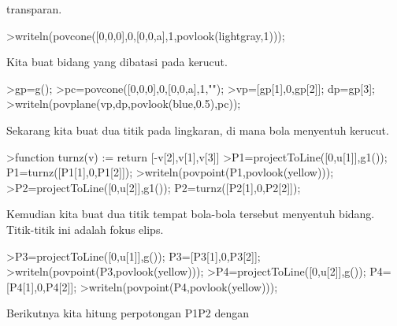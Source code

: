 \documentclass[a4paper,10pt]{article}
\begin{document}
\begin{eulernotebook}
\begin{eulercomment}
\begin{eulercomment}
\begin{eulercomment}
\begin{eulercomment}
\begin{eulercomment}
\begin{eulercomment}
\begin{eulercomment}
\begin{eulercomment}
\begin{eulercomment}
\begin{eulercomment}
\begin{eulercomment}
\begin{eulercomment}
\begin{eulercomment}
\begin{eulercomment}
\begin{eulercomment}
\begin{eulercomment}
\begin{eulercomment}
\begin{eulercomment}
\begin{eulercomment}
\begin{eulercomment}
\begin{eulercomment}
\begin{eulercomment}
\begin{eulercomment}
\begin{eulercomment}
\begin{eulercomment}
\begin{eulercomment}
\begin{eulercomment}
\begin{eulercomment}
\begin{eulercomment}
\begin{eulercomment}
\begin{eulercomment}
\begin{eulercomment}
\begin{eulercomment}
\begin{eulercomment}
\begin{eulercomment}
\begin{eulercomment}
\begin{eulercomment}
\begin{eulercomment}
\begin{eulercomment}
\begin{eulercomment}
\begin{eulercomment}
\begin{eulercomment}
\begin{eulercomment}
\begin{eulercomment}
\begin{eulercomment}
\begin{eulercomment}
\begin{eulercomment}
\begin{eulercomment}
\begin{eulercomment}
\begin{eulercomment}
\begin{eulercomment}
\begin{eulercomment}
\begin{eulercomment}
\begin{eulercomment}
\begin{eulercomment}
\begin{eulercomment}
\begin{eulercomment}
\begin{eulercomment}
\begin{eulercomment}
\begin{eulercomment}
\begin{eulercomment}
\begin{eulercomment}
\begin{eulercomment}
\begin{eulercomment}
\begin{eulercomment}
transparan.
\end{eulercomment}
\begin{eulerprompt}
>writeln(povcone([0,0,0],0,[0,0,a],1,povlook(lightgray,1)));
\end{eulerprompt}
\begin{eulercomment}
Kita buat bidang yang dibatasi pada kerucut.
\end{eulercomment}
\begin{eulerprompt}
>gp=g();
>pc=povcone([0,0,0],0,[0,0,a],1,"");
>vp=[gp[1],0,gp[2]]; dp=gp[3];
>writeln(povplane(vp,dp,povlook(blue,0.5),pc));
\end{eulerprompt}
\begin{eulercomment}
Sekarang kita buat dua titik pada lingkaran, di mana bola menyentuh
kerucut.
\end{eulercomment}
\begin{eulerprompt}
>function turnz(v) := return [-v[2],v[1],v[3]]
>P1=projectToLine([0,u[1]],g1()); P1=turnz([P1[1],0,P1[2]]);
>writeln(povpoint(P1,povlook(yellow)));
>P2=projectToLine([0,u[2]],g1()); P2=turnz([P2[1],0,P2[2]]);
\end{eulerprompt}
\begin{eulercomment}
Kemudian kita buat dua titik tempat bola-bola tersebut menyentuh
bidang. Titik-titik ini adalah fokus elips.
\end{eulercomment}
\begin{eulerprompt}
>P3=projectToLine([0,u[1]],g()); P3=[P3[1],0,P3[2]];
>writeln(povpoint(P3,povlook(yellow)));
>P4=projectToLine([0,u[2]],g()); P4=[P4[1],0,P4[2]];
>writeln(povpoint(P4,povlook(yellow)));
\end{eulerprompt}
\begin{eulercomment}
Berikutnya kita hitung perpotongan P1P2 dengan 
\end{eulercomment}
\end{eulercomment}
\end{eulercomment}
\end{eulercomment}
\end{eulercomment}
\end{eulercomment}
\end{eulercomment}
\end{eulercomment}
\end{eulercomment}
\end{eulercomment}
\end{eulercomment}
\end{eulercomment}
\end{eulercomment}
\end{eulercomment}
\end{eulercomment}
\end{eulercomment}
\end{eulercomment}
\end{eulercomment}
\end{eulercomment}
\end{eulercomment}
\end{eulercomment}
\end{eulercomment}
\end{eulercomment}
\end{eulercomment}
\end{eulercomment}
\end{eulercomment}
\end{eulercomment}
\end{eulercomment}
\end{eulercomment}
\end{eulercomment}
\end{eulercomment}
\end{eulercomment}
\end{eulercomment}
\end{eulercomment}
\end{eulercomment}
\end{eulercomment}
\end{eulercomment}
\end{eulercomment}
\end{eulercomment}
\end{eulercomment}
\end{eulercomment}
\end{eulercomment}
\end{eulercomment}
\end{eulercomment}
\end{eulercomment}
\end{eulercomment}
\end{eulercomment}
\end{eulercomment}
\end{eulercomment}
\end{eulercomment}
\end{eulercomment}
\end{eulercomment}
\end{eulercomment}
\end{eulercomment}
\end{eulercomment}
\end{eulercomment}
\end{eulercomment}
\end{eulercomment}
\end{eulercomment}
\end{eulercomment}
\end{eulercomment}
\end{eulercomment}
\end{eulercomment}
\end{eulercomment}
\end{eulercomment}
\end{eulernotebook}
\end{document}
